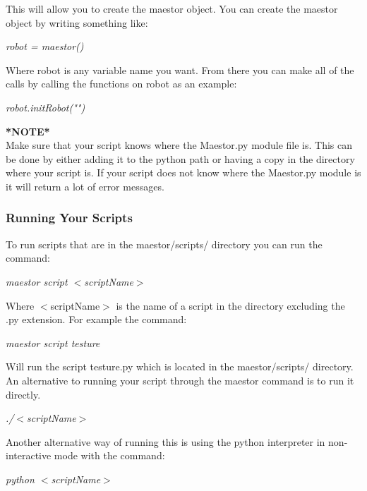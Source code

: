 \documentclass[12pt]{article}
\begin{document}
This will allow you to create the maestor object. You can create the maestor object by writing something like: 

\begin{center}
	\textit{robot = maestor()}
\end{center}

Where robot is any variable name you want. From there you can make all of the calls by calling the functions on robot as an example:

\begin{center}
	\textit{robot.initRobot("")}
\end{center}

\noindent \textbf{*NOTE*}\\
\noindent Make sure that your script knows where the Maestor.py module file is. This can be done by either adding it to the python path or having a copy in the directory where your script is. If your script does not know where the Maestor.py module is it will return a lot of error messages.  

\subsubsection{Running Your Scripts}


To run scripts that are in the maestor/scripts/ directory you can run the command: 

\begin{center}
	\textit{maestor script $<$scriptName$>$}
\end{center}

Where $<$scriptName$>$ is the name of a script in the directory excluding the .py extension. For example the command:

\begin{center}
	\textit{maestor script testure}
\end{center}

Will run the script testure.py which is located in the maestor/scripts/ directory. An alternative to running your script through the maestor command is to run it directly. 

\begin{center}
	\textit{./$<$scriptName$>$}
\end{center}

Another alternative way of running this is using the python interpreter in non-interactive mode with the command:

\begin{center}
	\textit{python $<$scriptName$>$}
\end{center}
\end{document}
